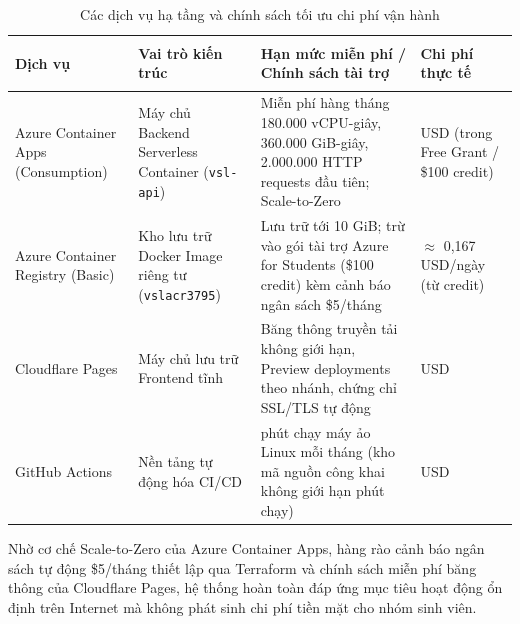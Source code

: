 \begin{table}[H]
\centering
\caption{Các dịch vụ hạ tầng và chính sách tối ưu chi phí vận hành}
\label{tab:free_tier_limits}
\begin{tabularx}{\textwidth}{>{\bfseries\raggedright\arraybackslash}p{3.0cm} >{\raggedright\arraybackslash}p{3.5cm} >{\raggedright\arraybackslash}X >{\centering\arraybackslash}p{2.1cm}}
\toprule
Dịch vụ & Vai trò kiến trúc & Hạn mức miễn phí / Chính sách tài trợ & Chi phí thực tế \\
\midrule
Azure Container Apps (Consumption) & Máy chủ Backend Serverless Container (\texttt{vsl-api}) & Miễn phí hàng tháng 180.000 vCPU-giây, 360.000 GiB-giây, 2.000.000 HTTP requests đầu tiên; Scale-to-Zero & 0 USD (trong Free Grant / \$100 credit) \\
\midrule
Azure Container Registry (Basic) & Kho lưu trữ Docker Image riêng tư (\texttt{vslacr3795}) & Lưu trữ tới 10 GiB; trừ vào gói tài trợ Azure for Students (\$100 credit) kèm cảnh báo ngân sách \$5/tháng & $\approx$ 0,167 USD/ngày (từ credit) \\
\midrule
Cloudflare Pages & Máy chủ lưu trữ Frontend tĩnh & Băng thông truyền tải không giới hạn, Preview deployments theo nhánh, chứng chỉ SSL/TLS tự động & 0 USD \\
\midrule
GitHub Actions & Nền tảng tự động hóa CI/CD & 2.000 phút chạy máy ảo Linux mỗi tháng (kho mã nguồn công khai không giới hạn phút chạy) & 0 USD \\
\bottomrule
\end{tabularx}
\end{table}

Nhờ cơ chế Scale-to-Zero của Azure Container Apps, hàng rào cảnh báo ngân sách tự động \$5/tháng thiết lập qua Terraform và chính sách miễn phí băng thông của Cloudflare Pages, hệ thống hoàn toàn đáp ứng mục tiêu hoạt động ổn định trên Internet mà không phát sinh chi phí tiền mặt cho nhóm sinh viên.
